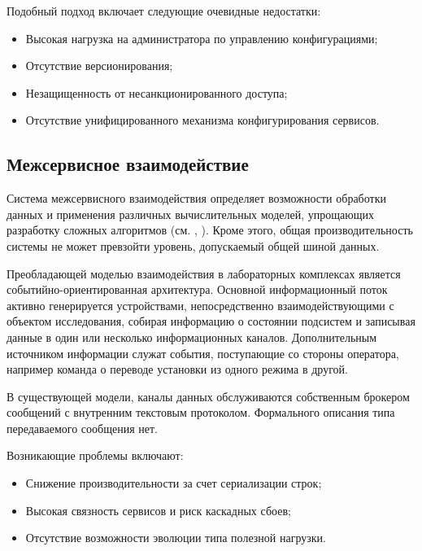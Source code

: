 \documentclass[../thesis.tex]{subfiles}
\begin{document}
	Подобный подход включает следующие очевидные недостатки:

	\begin{itemize}
		\item Высокая нагрузка на администратора по управлению конфигурациями;

		\item Отсутствие версионирования;

		\item Незащищенность от несанкционированного доступа;

		\item Отсутствие унифицированного механизма конфигурирования сервисов.
	\end{itemize}

	\subsection{Межсервисное взаимодействие}

	Система межсервисного взаимодействия определяет возможности обработки данных и применения различных
	вычислительных моделей, упрощающих разработку сложных алгоритмов (см. \cite{mapreduce}, \cite{dataflow}).
	Кроме этого, общая производительность системы не может превзойти уровень, допускаемый общей шиной
	данных.

	Преобладающей моделью взаимодействия в лабораторных комплексах является событийно-ориентированная
	архитектура. Основной информационный поток активно генерируется устройствами, непосредственно взаимодействующими
	с объектом исследования, собирая информацию о состоянии подсистем и записывая данные в один или
	несколько информационных каналов. Дополнительным источником информации служат события,
	поступающие со стороны оператора, например команда о переводе установки из одного режима в другой.

	В существующей модели, каналы данных обслуживаются собственным брокером сообщений с внутренним
	текстовым протоколом. Формального описания типа передаваемого сообщения нет.

	Возникающие проблемы включают:

	\begin{itemize}
		\item Снижение производительности за счет сериализации строк;

		\item Высокая связность сервисов и риск каскадных сбоев;

		\item Отсутствие возможности эволюции типа полезной нагрузки.
	\end{itemize}
\end{document}
